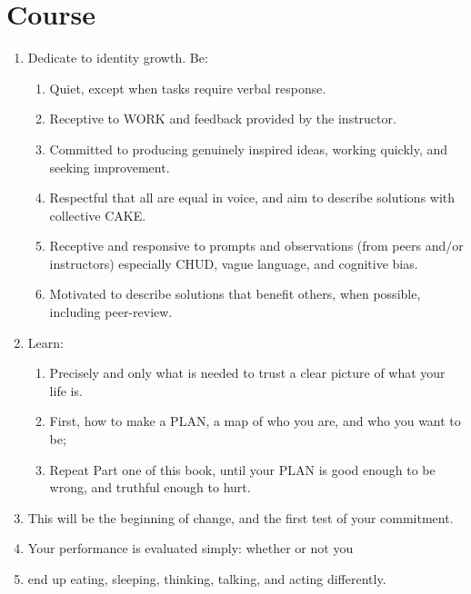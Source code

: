 \documentclass[
]{book}
\providecommand{\tightlist}{%
  \setlength{\itemsep}{0pt}\setlength{\parskip}{0pt}}
\begin{document}
\hypertarget{course}{%
\section{Course}\label{course}}

\begin{enumerate}
\def\labelenumi{\arabic{enumi}.}
\setcounter{enumi}{37}
\tightlist
\item
  Dedicate to identity growth. Be:

  \begin{enumerate}
  \def\labelenumii{\arabic{enumii}.}
  \tightlist
  \item
    Quiet, except when tasks require verbal response.
  \item
    Receptive to WORK and feedback provided by the instructor.
  \item
    Committed to producing genuinely inspired ideas, working
    quickly, and seeking improvement.
  \item
    Respectful that all are equal in voice, and aim to describe
    solutions with collective CAKE.
  \item
    Receptive and responsive to prompts and observations (from peers
    and/or instructors) especially CHUD, vague language, and
    cognitive bias.
  \item
    Motivated to describe solutions that benefit others, when
    possible, including peer-review.
  \end{enumerate}
\item
  Learn:

  \begin{enumerate}
  \def\labelenumii{\arabic{enumii}.}
  \tightlist
  \item
    Precisely and only what is needed to trust a clear picture of
    what your life is.
  \item
    First, how to make a PLAN, a map of who you are, and who you
    want to be;
  \item
    Repeat Part one of this book, until your PLAN is good enough to
    be wrong, and truthful enough to hurt.
  \end{enumerate}
\item
  This will be the beginning of change, and the first test of your
  commitment.
\item
  Your performance is evaluated simply: whether or not you
\item
  end up eating, sleeping, thinking, talking, and acting differently.
\end{enumerate}
\end{document}
